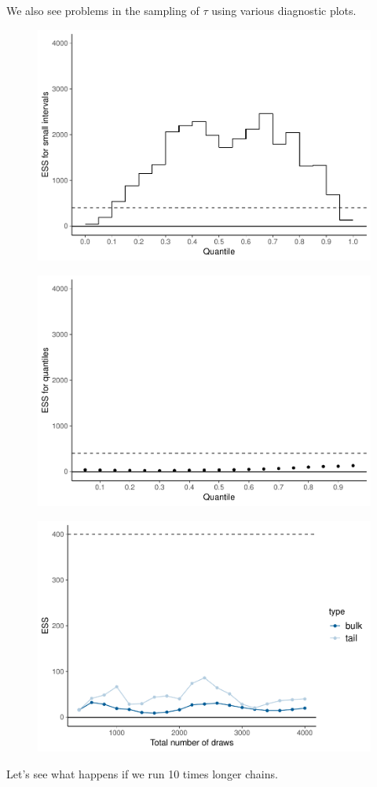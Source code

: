 \documentclass[american,]{article}
\begin{document}
We also see problems in the sampling of $\tau$ using various
diagnostic plots.

\begin{figure}[tp]
  \centering
  \includegraphics[width=0.6\linewidth]{graphics/local-ess-jags-cp-tau-1.pdf}
\end{figure}

\begin{figure}[tp]
  \centering
  \includegraphics[width=0.6\linewidth]{graphics/quantile-ess-jags-cp-tau-1.pdf}
\end{figure}

\begin{figure}[tp]
  \centering
  \includegraphics[width=0.6\linewidth]{graphics/change-ess-jags-cp-tau-1.pdf}
\end{figure}

Let's see what happens if we run 10 times longer chains.
\end{document}
